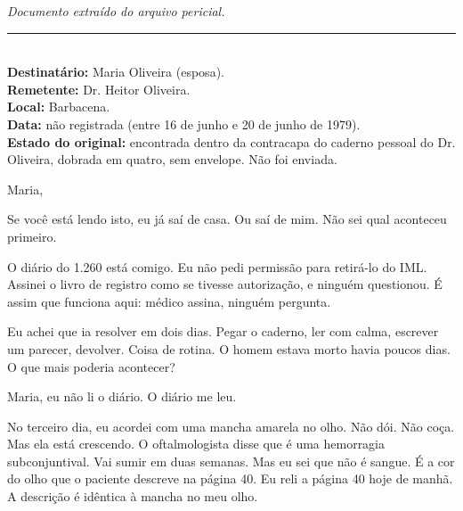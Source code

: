 
\noindent \textit{Documento extraído do arquivo pericial.}

\vspace{0.5em}\noindent\rule{\textwidth}{0.5pt}\vspace{0.5em}

\\[-0.2em]

\noindent \textbf{Destinatário:} Maria Oliveira (esposa).\\
\noindent \textbf{Remetente:} Dr. Heitor Oliveira.\\
\noindent \textbf{Local:} Barbacena.\\
\noindent\textbf{Data:} não registrada (entre 16 de junho e 20 de junho de 1979).\\
\noindent\textbf{Estado do original:} encontrada dentro da contracapa do caderno pessoal do Dr. Oliveira, dobrada em quatro, sem envelope. Não foi enviada.

\noindent Maria,

\noindent Se você está lendo isto, eu já saí de casa. Ou saí de mim. Não sei qual
\noindent aconteceu primeiro.

\noindent O diário do 1.260 está comigo. Eu não pedi permissão para retirá-lo
\noindent do IML. Assinei o livro de registro como se tivesse autorização, e ninguém
\noindent questionou. É assim que funciona aqui: médico assina, ninguém pergunta.

\noindent Eu achei que ia resolver em dois dias. Pegar o caderno, ler com calma,
\noindent escrever um parecer, devolver. Coisa de rotina. O homem estava morto havia
\noindent poucos dias. O que mais poderia acontecer?

\noindent Maria, eu não li o diário. O diário me leu.

\noindent No terceiro dia, eu acordei com uma mancha amarela no olho. Não dói.
\noindent Não coça. Mas ela está crescendo. O oftalmologista disse que é uma
\noindent hemorragia subconjuntival. Vai sumir em duas semanas. Mas eu sei que não é
\noindent sangue. É a cor do olho que o paciente descreve na página 40. Eu reli a
\noindent página 40 hoje de manhã. A descrição é idêntica à mancha no meu olho.


